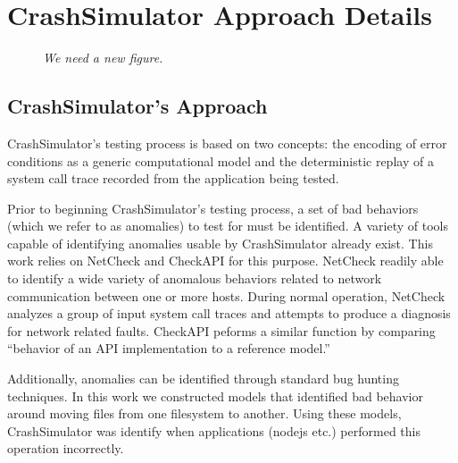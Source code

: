 \section{CrashSimulator Approach Details}
    \begin{figure}[t]
        \center{}
        \caption{\emph{We need a new figure.}}

    \end{figure}

    \subsection{CrashSimulator's Approach}

    CrashSimulator's testing process is based on two concepts: the encoding of error conditions as a generic
    computational model and the deterministic replay of a system call trace recorded from the application being tested.

    Prior to beginning CrashSimulator's testing process, a set of bad behaviors (which we refer to as anomalies) to test
    for must be identified.  A variety of tools capable of identifying anomalies usable by CrashSimulator already
    exist.  This work relies on NetCheck and CheckAPI for this purpose. NetCheck readily able to identify a wide variety
    of anomalous behaviors related to network communication between one or more hosts. During normal operation, NetCheck
    analyzes a group of input system call traces and attempts to produce a diagnosis for network related
    faults. CheckAPI peforms a similar function by comparing ``behavior of an API implementation to a reference model.''

    Additionally, anomalies can be identified through standard bug hunting techniques.  In this work we constructed
    models that identified bad behavior around moving files from one filesystem to another.  Using these models,
    CrashSimulator was identify when applications (nodejs etc.) performed this operation incorrectly.

